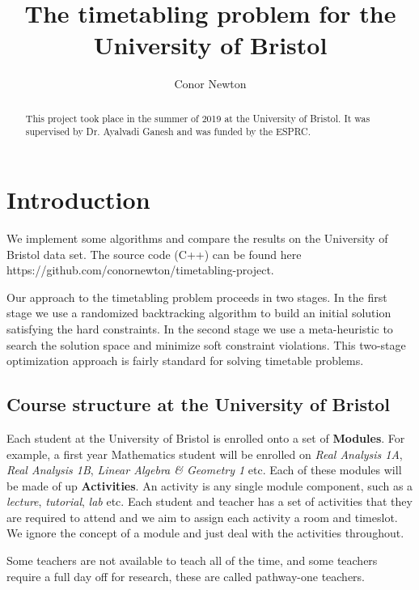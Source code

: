 \documentclass[12pt]{article}
\author{Conor Newton}
\title{The timetabling problem for the University of Bristol}
\theoremstyle{definition}
\theoremstyle{plain}
\begin{document}
\maketitle

\begin{abstract}
	This project took place in the summer of 2019 at the University of Bristol. It was supervised by Dr. Ayalvadi Ganesh and was funded by the ESPRC.
\end{abstract}

\newpage
{}

\section{Introduction}


We implement some algorithms and compare the results on the University of Bristol data set. The source code (C++) can be found here https://github.com/conornewton/timetabling-project.

Our approach to the timetabling problem proceeds in two stages. In the first stage we use a randomized backtracking algorithm to build an initial solution satisfying the hard constraints. In the second stage we use a meta-heuristic to search the solution space and minimize soft constraint violations. This two-stage optimization approach is fairly standard for solving timetable problems.

\subsection{Course structure at the University of Bristol}

Each student at the University of Bristol is enrolled onto a set of \textbf{Modules}. For example, a first year Mathematics student will be enrolled on \textit{Real Analysis 1A}, \textit{Real Analysis 1B}, \textit{Linear Algebra \& Geometry 1} etc. Each of these modules will be made of up \textbf{Activities}. An activity is any single module component, such as a \textit{lecture}, \textit{tutorial}, \textit{lab}  etc. Each student and teacher has a set of activities that they are required to attend and we aim to assign each activity a room and timeslot. We ignore the concept of a module and just deal with the activities throughout.

Some teachers are not available to teach all of the time, and some teachers require a full day off for research, these are called pathway-one teachers.
\end{document}
